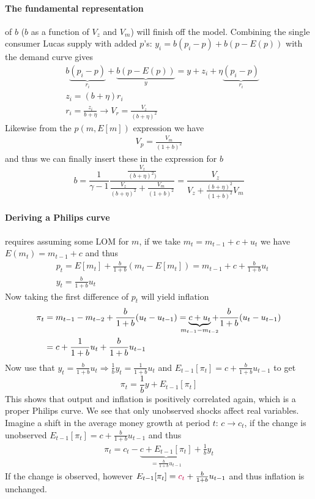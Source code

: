 \documentclass[12pt, a4paper]{article}
\begin{document}
\begin{spacing}{1.213}
\paragraph{The fundamental representation} of $b$ ($b$ as a function of $V_z$ and $V_m$) will finish off the model. Combining the single consumer Lucas supply with added $p$'s: $y_i = b(p_i-p) + b(p - E(p))$ with the demand curve gives
\begin{align}
& b\underbrace{(p_i-p)}_{r_i} + \underbrace{b(p - E(p))}_{y} = y + z_i + \eta \underbrace{ (p_i - p)}_{r_i} \\
& z_i = (b+ \eta)r_i \\
& r_i = \frac{z_i}{b+ \eta} \rightarrow V_r = \frac{V_z}{(b+ \eta)^2}
\end{align}
Likewise from the $p(m, E[m])$ expression we have 
\begin{align*}
V_p = \frac{V_m}{(1+b)^2}
\end{align*}
and thus we can finally insert these in the expression for $b$ 
\begin{equation}
b = \frac{1}{\gamma -1 } \frac{ \frac{V_z}{(b+\eta)^2)} }{ \frac{V_z}{(b+\eta)^2} + \frac{V_m}{(1+b)^2} } = \frac{V_z}{V_z + \frac{(b + \eta)^2}{(1+b)^2} V_m}
\end{equation}

\paragraph{Deriving a Philips curve} requires assuming some LOM for $m$, if we take $m_t = m_{t-1} + c + u_t$ we have $E(m_t)=m_{t-1}+c$ and thus 
\begin{align*}
&p_t  = E[m_t] + \frac{b}{1+b}(m_t- E[m_t]) = m_{t-1} + c + \frac{b}{1+b} u_t \\
& y_t  = \frac{b}{1+b} u_t
\end{align*}
Now taking the first difference of $p_t$ will yield inflation 
\begin{align*}
\pi_t &= m_{t-1} - m_{t-2} + \frac{b}{1+b}(u_t -u_{t-1}) = \underbrace{c + u_{t}}_{\mathclap{m_{t-1}-m_{t-2}}} + \frac{b}{1+b}(u_t -u_{t-1} ) 
\\
&= c + \frac{1}{1+b}u_t + \frac{b}{1+b}u_{t-1}
\end{align*}
Now use that $y_t  = \frac{b}{1+b} u_t \Rightarrow \frac{1}{b}y_t = \frac{1}{1+b}u_t$ and $E_{t-1}[\pi_t] = c +\frac{b}{1+b}u_{t-1}$ to get 
\begin{equation}
\pi_t = \frac{1}{b}y + E_{t-1}[\pi_t]
\end{equation}
This shows that output and inflation is positively correlated again, which is a proper Philips curve. We see that only unobserved shocks affect real variables. Imagine a shift in the average money growth at period $t$: $c \rightarrow c_t$, if the change is unobserved $E_{t-1}[\pi_t] = c + \frac{b}{1+b}u_{t-1}$ and thus 
\begin{align*}
\pi_t = c_t - \underbrace{c + E_{t-1}[\pi_t]}_{= \frac{b}{1+b}u_{t-1}} + \frac{1}{b}y_t
\end{align*}
If the change is observed, however $E_{t-1}[\pi_t] = \textcolor{purple}{c_t} + \frac{b}{1+b}u_{t-1}$ and thus inflation is unchanged.


\end{spacing}
\end{document}
